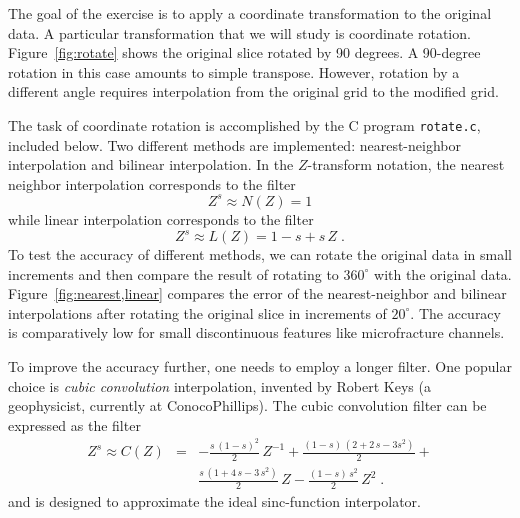 
The goal of the exercise is to apply a coordinate transformation to
the original data. A particular transformation that we will study is
coordinate rotation. Figure~\ref{fig:rotate} shows the original slice
rotated by 90 degrees. A 90-degree rotation in this case amounts to
simple transpose. However, rotation by a different angle requires
interpolation from the original grid to the modified grid.

The task of coordinate rotation is accomplished by the C program
\texttt{rotate.c}, included below. Two different methods are implemented: 
nearest-neighbor interpolation and bilinear interpolation. In the
$Z$-transform notation, the nearest neighbor interpolation corresponds
to the filter
\begin{equation}
\label{eq:nearest}
Z^s \approx N(Z) = 1
\end{equation}
while linear interpolation corresponds to the filter
\begin{equation}
\label{eq:linear}
Z^s \approx L(Z) = 1-s + s\,Z\;.
\end{equation}
To test the accuracy of different methods, we can rotate the original
data in small increments and then compare the result of rotating to
$360^{\circ}$ with the original data. Figure~\ref{fig:nearest,linear}
compares the error of the nearest-neighbor and bilinear interpolations
after rotating the original slice in increments of $20^{\circ}$. The
accuracy is comparatively low for small discontinuous features like
microfracture channels.

To improve the accuracy further, one needs to employ a longer
filter. One popular choice is \emph{cubic convolution} interpolation,
invented by Robert Keys (a geophysicist, currently at ConocoPhillips).
The cubic convolution filter can be expressed as the filter
\begin{eqnarray}
\nonumber
Z^s \approx C(Z) & = & -\frac{s\,(1-s)^2}{2}\,Z^{-1} + \frac{(1-s)\,(2 + 2\,s - 3 s^2)}{2} + \\
&  & \frac{s\,(1 + 4\,s - 3\,s^2)}{2}\,Z - \frac{(1-s)\,s^2}{2}\,Z^2\;.
\label{eq:cubic}
\end{eqnarray}
and is designed to approximate the ideal sinc-function interpolator.

\lstset{language=c,numbers=left,numberstyle=\tiny,showstringspaces=false}


